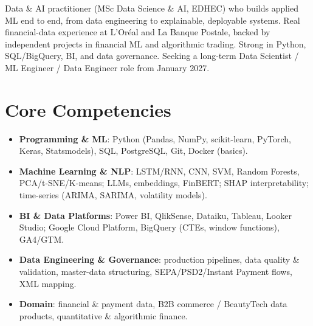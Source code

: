 \documentclass[11pt,a4paper,sans]{moderncv}
\begin{document}
\makecvtitle


\vspace{6pt}
\small{Data \& AI practitioner (MSc Data Science \& AI, EDHEC) who builds applied ML end to end, from data engineering to explainable, deployable systems. Real financial-data experience at L'Oréal and La Banque Postale, backed by independent projects in financial ML and algorithmic trading. Strong in Python, SQL/BigQuery, BI, and data governance. Seeking a long-term Data Scientist / ML Engineer / Data Engineer role from January 2027.}


\section{Core Competencies}
\vspace{1pt}
\begin{itemize}
\item \textbf{Programming \& ML}: Python (Pandas, NumPy, scikit-learn, PyTorch, Keras, Statsmodels), SQL, PostgreSQL, Git, Docker (basics).
\item \textbf{Machine Learning \& NLP}: LSTM/RNN, CNN, SVM, Random Forests, PCA/t-SNE/K-means; LLMs, embeddings, FinBERT; SHAP interpretability; time-series (ARIMA, SARIMA, volatility models).
\item \textbf{BI \& Data Platforms}: Power BI, QlikSense, Dataiku, Tableau, Looker Studio; Google Cloud Platform, BigQuery (CTEs, window functions), GA4/GTM.
\item \textbf{Data Engineering \& Governance}: production pipelines, data quality \& validation, master-data structuring, SEPA/PSD2/Instant Payment flows, XML mapping.
\item \textbf{Domain}: financial \& payment data, B2B commerce / BeautyTech data products, quantitative \& algorithmic finance.
\end{itemize}

\end{document}
